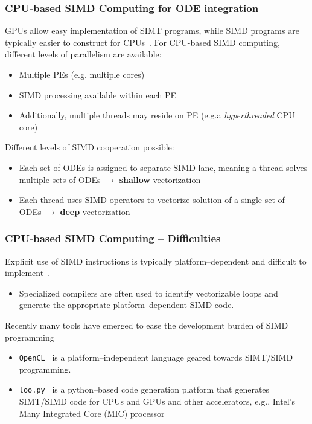 \documentclass{beamer}
\begin{document}
    
\begin{frame}
 \frametitle{CPU-based SIMD Computing for ODE integration}
 GPUs allow easy implementation of SIMT programs, while SIMD programs are typically easier to construct for CPUs~.
 For CPU-based SIMD computing, different levels of parallelism are available:
 \begin{itemize}
  \item Multiple PEs (e.g. multiple cores)
  \item SIMD processing available within each PE
  \item Additionally, multiple threads may reside on PE (e.g.a \textit{hyperthreaded} CPU core)
 \end{itemize}
 Different levels of SIMD cooperation possible:
 \begin{itemize}
  \item Each set of ODEs is assigned to separate SIMD lane, meaning a thread solves multiple sets of ODEs $\rightarrow$ \textbf{shallow} vectorization
  \item Each thread uses SIMD operators to vectorize solution of a single set of ODEs $\rightarrow$ \textbf{deep} vectorization
 \end{itemize}
\end{frame}

\begin{frame}
  \frametitle{CPU-based SIMD Computing -- Difficulties}
  Explicit use of SIMD instructions is typically platform--dependent and difficult to implement~.
  \begin{itemize}
   \item Specialized compilers are often used to identify vectorizable loops and generate the appropriate platform--dependent SIMD code.
  \end{itemize}
  Recently many tools have emerged to ease the development burden of SIMD programming
  \begin{itemize}
   \item \texttt{OpenCL}~ is a platform--independent language geared towards SIMT\slash SIMD programming.
   \item \texttt{loo.py}~ is a python--based code generation platform that generates SIMT\slash SIMD code for CPUs and GPUs and other accelerators, e.g., Intel's Many Integrated Core (MIC) processor
  \end{itemize}
\end{frame}
\end{document}
